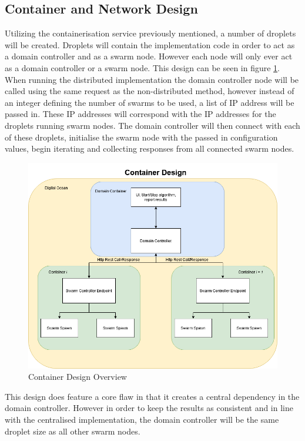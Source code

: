 \documentclass[oneside,12pt]{book}
\begin{document}
\subsection{Container and Network Design}
Utilizing the containerisation service previously mentioned, a number of droplets will be created. Droplets will contain the implementation code in order to act as a domain controller and as a swarm node. However each node will only ever act as a domain controller or a swarm node. This design can be seen in figure \ref{fig:ContainerDesignOverview}. When running the distributed implementation the domain controller node will be called using the same request as the non-distributed method, however instead of an integer defining the number of swarms to be used, a list of IP address will be passed in. These IP addresses will correspond with the IP addresses for the droplets running swarm nodes. The domain controller will then connect with each of these droplets, initialise the swarm node with the passed in configuration values, begin iterating and collecting responses from all connected swarm nodes.

\begin{figure}[H]
    \centering
    \includegraphics[scale=0.4]{Images/ContainerDesign.png}
    \caption{Container Design Overview}
    \label{fig:ContainerDesignOverview}
\end{figure}

This design does feature a core flaw in that it creates a central dependency in the domain controller. However in order to keep the results as consistent and in line with the centralised implementation, the domain controller will be the same droplet size as all other swarm nodes. 
\end{document}
